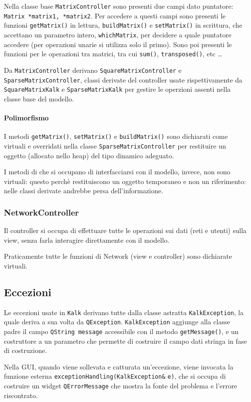 Nella classe base \texttt{MatrixController} sono presenti due campi dato puntatore: \texttt{Matrix *matrix1, *matrix2}. Per accedere a questi campi sono 
presenti le funzioni \texttt{getMatrix()} in lettura, \texttt{buildMatrix()} e \texttt{setMatrix()} in scrittura, che accettano un parametro 
intero, \texttt{whichMatrix}, per decidere a quale puntatore accedere (per operazioni unarie si utilizza solo il primo). 
Sono poi presenti le funzioni per le operazioni tra matrici, tra cui \texttt{sum()}, \texttt{transposed()}, etc \dots \par
Da \texttt{MatrixController} derivano \texttt{SquareMatrixController} e \texttt{SparseMatrixController}, classi derivate del controller usate rispettivamente 
da \texttt{SquareMatrixKalk} e \texttt{SparseMatrixKalk} per gestire le operzioni assenti nella classe base del modello.

\paragraph{Polimorfismo} 
I metodi \texttt{getMatrix()}, \texttt{setMatrix()} e \texttt{buildMatrix()} sono dichiarati come virtuali e overridati nella classe 
\texttt{SparseMatrixController} per restituire un oggetto (allocato nello heap) del tipo dinamico adeguato.\par
I metodi di che si occupano di interfacciarsi con il modello, invece, non sono virtuali: questo perchè restituiscono un oggetto 
temporaneo e non un riferimento: nelle classi derivate andrebbe persa dell'informazione.

\subsubsection{NetworkController}
Il controller si occupa di effettuare tutte le operazioni sui dati (reti e utenti) sulla view, 
senza farla interagire direttamente con il modello.
\medskip

Praticamente tutte le funzioni di Network (view e controller) sono dichiarate virtuali.

\subsection{Eccezioni}

Le eccezioni usate in \texttt{Kalk} derivano tutte dalla classe astratta \texttt{KalkException}, la quale deriva a sua volta da \texttt{QException}.
\texttt{KalkException} aggiunge alla classe padre il campo \texttt{QString message} accessibile con il metodo \texttt{getMessage()}, e un 
costruttore a un parametro che permette di costruire il campo dati stringa in fase di costruzione. \par
Nella GUI, quando viene sollevata e catturata un'eccezione, viene invocata la funzione esterna \texttt{exceptionHandling(KalkException}\verb|&| \texttt{e)}, che si occupa di costruire un 
widget \texttt{QErrorMessage} che mostra la fonte del problema e l'errore riscontrato.

